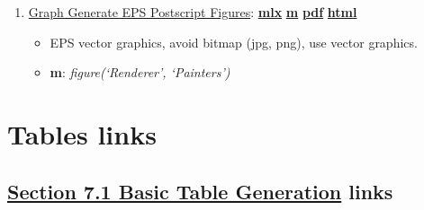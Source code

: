 \documentclass[
]{book}
\providecommand{\tightlist}{%
  \setlength{\itemsep}{0pt}\setlength{\parskip}{0pt}}
\begin{document}
\begin{enumerate}
\def\labelenumi{\arabic{enumi}.}
\tightlist
\item
  \href{https://fanwangecon.github.io/M4Econ/graph/export/htmlpdfm/fs_eps.html}{Graph Generate EPS Postscript Figures}: \href{https://github.com/FanWangEcon/M4Econ/blob/master/graph/export/fs_eps.mlx}{\textbf{mlx}} \textbar{} \href{https://github.com/FanWangEcon/M4Econ/blob/master/graph/export/htmlpdfm/fs_eps.m}{\textbf{m}} \textbar{} \href{https://github.com/FanWangEcon/M4Econ/blob/master/graph/export/htmlpdfm/fs_eps.pdf}{\textbf{pdf}} \textbar{} \href{https://fanwangecon.github.io/M4Econ/graph/export/htmlpdfm/fs_eps.html}{\textbf{html}}

  \begin{itemize}
  \tightlist
  \item
    EPS vector graphics, avoid bitmap (jpg, png), use vector graphics.
  \item
    \textbf{m}: \emph{figure(`Renderer', `Painters')}
  \end{itemize}
\end{enumerate}

\hypertarget{tables-links}{%
\section{Tables links}\label{tables-links}}

\hypertarget{section-7.1-basic-table-generationbasic-table-generation-links}{%
\subsection{\texorpdfstring{\protect\hyperlink{basic-table-generation}{Section 7.1 Basic Table Generation} links}{Section 7.1 Basic Table Generation links}}\label{section-7.1-basic-table-generationbasic-table-generation-links}}
\end{document}
